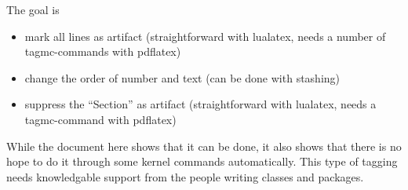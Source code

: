 \documentclass[12pt]{article}
\begin{document}
The goal is
\begin{itemize}
\item mark all lines as artifact (straightforward with lualatex, needs a number of tagmc-commands with pdflatex)
\item change the order of number and text (can be done with stashing)
\item suppress the \enquote{Section} as artifact (straightforward with lualatex, needs a tagmc-command with pdflatex)
\end{itemize}

While the document here shows that it can be done, it also shows that there is no hope
to do it through some kernel commands automatically. This type of tagging needs knowledgable support from the people writing classes and packages.
\tagmcend%

\tagstructend
\end{document}
